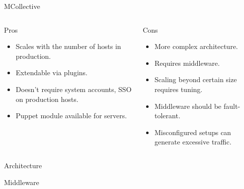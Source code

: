 \documentclass[presentation]{beamer}
\begin{document}
{
\begin{frame}[label=sec-7-4]{MCollective}

\begin{columns}
\begin{column}{0.5\textwidth}
\begin{block}{Pros}

\begin{itemize}
\item Scales with the number of hosts in production.
\item Extendable via plugins.
\item Doesn't require system accounts, SSO on production hosts.
\item Puppet module available for servers.
\end{itemize}
\end{block}
\end{column}

\begin{column}{0.5\textwidth}
\begin{block}{Cons}

\begin{itemize}
\item More complex architecture.
\item Requires middleware.
\item Scaling beyond certain size requires tuning.
\item Middleware should be fault-tolerant.
\item Misconfigured setups can generate excessive traffic.
\end{itemize}
\end{block}
\end{column}
\end{columns}
\end{frame}} %

{
\begin{frame}[label=sec-7-5]{Architecture}

\end{frame}} %

{
\begin{frame}[label=sec-7-6]{Middleware}
\end{frame}} %
\end{document}
